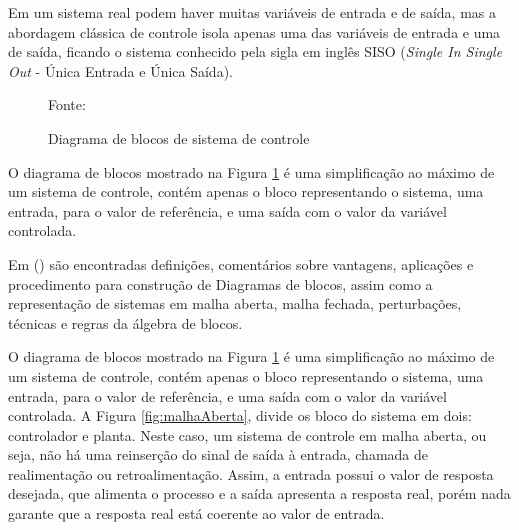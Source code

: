 Em um sistema real podem haver muitas variáveis de entrada e de saída, 
mas a abordagem clássica de controle isola apenas uma das variáveis de entrada e uma de saída, 
ficando o sistema conhecido pela sigla em inglês SISO (\emph{Single In Single Out} - Única Entrada e Única Saída).


\begin{figure}[!htb]
\centering
\caption{ Diagrama de blocos de sistema de controle}
\label{fig:processo}

{\small Fonte: \cite{Ogata} }
\end{figure}


O diagrama de blocos mostrado na Figura \ref{fig:processo} é uma simplificação ao máximo de um sistema de controle, 
contém apenas o bloco representando o sistema, 
uma entrada, para o valor de referência, 
e uma saída com o valor da variável controlada.


Em \citeauthor{Ogata}(\citeyear{Ogata}) %
são encontradas definições, 
comentários sobre vantagens, 
aplicações e procedimento para construção de Diagramas de blocos, 
assim como a representação de sistemas em malha aberta, 
malha fechada, 
perturbações, 
técnicas e regras da álgebra de blocos.





O diagrama de blocos mostrado na Figura \ref{fig:processo} é uma simplificação ao máximo de um sistema de controle, contém apenas o bloco representando o sistema, uma entrada, para o valor de referência, e uma saída com o valor da variável controlada. A Figura \ref{fig:malhaAberta}, divide os bloco do sistema em dois: controlador e planta. Neste caso, um sistema de controle em malha aberta, ou seja, não há uma reinserção do sinal de saída à entrada, chamada de realimentação ou retroalimentação. Assim, a entrada possui o valor de resposta desejada, que alimenta o processo e a saída apresenta a resposta real, porém nada garante que a resposta real está coerente ao valor de entrada.

